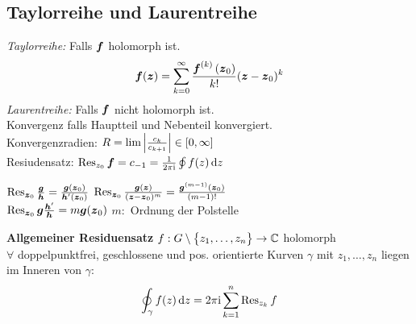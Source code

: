\documentclass[german,color,5pt]{latex4ei/latex4ei_fs}
\begin{document}
\begin{sectionbox}
	\subsection{Taylorreihe und Laurentreihe}
	\emph{Taylorreihe:} Falls $\boldsymbol{f}$ holomorph ist.
	\begin{equation*}
		\boldsymbol{f}(\boldsymbol{z}) = \sum\limits_{k = 0}^{\infty} \frac{\boldsymbol{f}^{(k)}\left(\boldsymbol{z}_0\right)}{k!} (\boldsymbol{z} - \boldsymbol{z}_0)^k
	\end{equation*}
	\emph{Laurentreihe:} Falls $\boldsymbol{f}$ nicht holomorph ist.\\
	Konvergenz falls Hauptteil und Nebenteil konvergiert. \\ 
	Konvergenzradien: $R = \lim \left\vert\frac{c_k}{c_{k+1}}\right\vert \in [0, \infty]$ \\ 
	Resiudensatz: $\Res_{z_0} \cx f = c_{-1} = \frac{1}{2\pi\i} \oint f(z) \diff z$
	
	\begin{emphbox}
		\raggedright
		$\operatorname{Res}_{\boldsymbol{z}_0} \frac{\boldsymbol{g}}{\boldsymbol{h}} = \frac{\boldsymbol{g}(\boldsymbol{z}_0)}{\boldsymbol{h}'(\boldsymbol{z}_0)}$ \qquad $\operatorname{Res}_{\boldsymbol{z}_0} \frac{\boldsymbol{g}(\boldsymbol{z})}{(\boldsymbol{z} - \boldsymbol{z}_0)^m} = \frac{\boldsymbol{g}^{(m-1)}(\boldsymbol{z}_0)}{(m-1)!}$\\
		$\operatorname{Res}_{\boldsymbol{z}_0} \boldsymbol{g} \frac{\boldsymbol{h}'}{\boldsymbol{h}} = m \boldsymbol{g}(\boldsymbol{z}_0)$ \qquad $m:$ Ordnung der Polstelle
	\end{emphbox}
	\textbf{Allgemeiner Residuensatz} $f:G \setminus \bigl\{z_1, \ldots, z_n\bigr\} \rightarrow \mathbb C$ holomorph \\ 
	$\forall $ doppelpunktfrei, geschlossene und pos. orientierte Kurven $\gamma$ mit $z_1, \dots, z_n$ liegen im Inneren von $\gamma$:
	\begin{equation*}
		\oint_\gamma f(z) \diff z = 2 \pi \i \sum_{k=1}^{n} \Res_{z_k} f
	\end{equation*}
\end{sectionbox}
\end{document}
